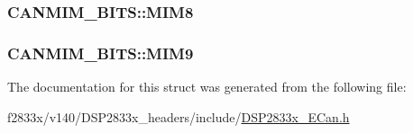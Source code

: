 \subsubsection[{M\+I\+M8}]{ C\+A\+N\+M\+I\+M\+\_\+\+B\+I\+T\+S\+::\+M\+I\+M8}\label{struct_c_a_n_m_i_m___b_i_t_s_aba0b06aa0a46f1f351995334bb8d4b7f}
\hypertarget{struct_c_a_n_m_i_m___b_i_t_s_ad42db341065f4ed4f73efe5535786bd4}{}
\subsubsection[{M\+I\+M9}]{ C\+A\+N\+M\+I\+M\+\_\+\+B\+I\+T\+S\+::\+M\+I\+M9}\label{struct_c_a_n_m_i_m___b_i_t_s_ad42db341065f4ed4f73efe5535786bd4}


The documentation for this struct was generated from the following file\+:\begin{DoxyCompactItemize}
\item 
f2833x/v140/\+D\+S\+P2833x\+\_\+headers/include/\hyperlink{_d_s_p2833x___e_can_8h}{D\+S\+P2833x\+\_\+\+E\+Can.\+h}\end{DoxyCompactItemize}
